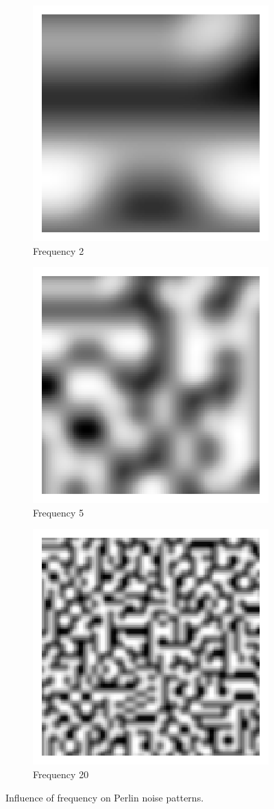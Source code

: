 \begin{figure}
\centering
\begin{subfigure}{0.33\textwidth}
	\centering
	\includegraphics[width=0.4\linewidth]{Images/perlin_noise_2}
	\caption{Frequency 2}
	\label{fig:perlin_noise_2}
\end{subfigure}%
\begin{subfigure}{0.33\textwidth}
	\centering
	\includegraphics[width=0.4\linewidth]{Images/perlin_noise}
	\caption{Frequency 5}
	\label{fig:perlin_noise_5}
\end{subfigure}%
\begin{subfigure}{0.33\textwidth}
	\centering
	\includegraphics[width=0.4\linewidth]{Images/perlin_noise_20}
	\caption{Frequency 20}
	\label{fig:perlin_noise_20}
\end{subfigure}
\caption[Influence of frequency on Perlin noise]{Influence of frequency on Perlin noise patterns.}
\label{fig:perlin_noise_frequencies}
\end{figure}

